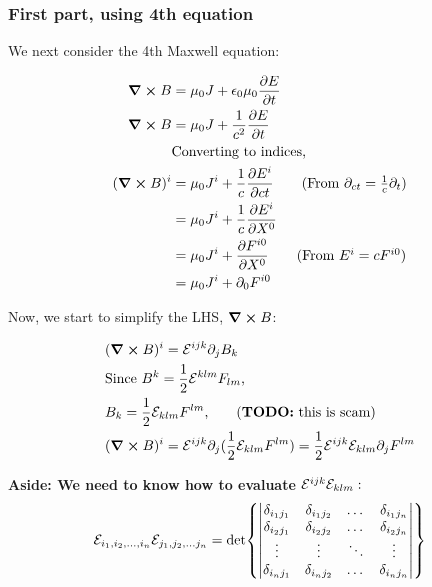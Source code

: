 \subsubsection{First part, using 4th equation}

We next consider the 4th Maxwell equation:

\begin{align*}
    \curl B &= \mu_0 J + \epsilon_0 \mu_0 \pdv{E}{t} \\
    \curl B &= \mu_0 J + \frac{1}{c^2} \pdv{E}{t} \\
            &\text{Converting to indices,}\\
    (\curl B)^i &= \mu_0 J^i + \frac{1}{c} \pdv{E^i}{ct} \tag{From $\partial_{ct} = \frac{1}{c} \partial_t$} \\
                &= \mu_0 J^i + \frac{1}{c} \pdv{E^i}{X^0} \\
                &= \mu_0 J^i + \pdv{F^{i0}}{X^0} \tag{From $E^i = c F^{i0}$} \\
                &= \mu_0 J^i + \partial_0 F^{i0}
\end{align*}

Now, we start to simplify the LHS, $\curl B$:

\begin{align*}
    &(\curl B)^i = \levicevita^{ijk} \partial_j B_k \\
    &\text{Since $B^k = \frac{1}{2} \levicevita^{klm} F_{lm}$,} \\
    &\text{$B_k = \frac{1}{2} \levicevita_{klm} F^{lm}$,} \tag{\textbf{TODO:} this is scam} \\
    &(\curl B)^i = \levicevita^{ijk} \partial_j (\frac{1}{2} \levicevita_{klm} F^{lm}) =
    \frac{1}{2} \levicevita^{ijk} \levicevita_{klm} \partial_j F^{lm}\\
\end{align*}

\textbf{Aside: We need to know how to evaluate $\mathcal{E}^{ijk} \mathcal{E}_{klm}:$}
\begin{align*}
    \mathcal{E}_{i_1, i_2, \dots, i_n} \mathcal{E}_{j_1, j_2, \dots j_n} =  
    \det{
    \begin{vmatrix}
        \delta_{i_1 j_1} & \delta_{i_1 j_2} &\dots &\delta_{i_1 j_n} \\
        \delta_{i_2 j_1} &\delta_{i_2 j_2} &\dots &\delta_{i_2 j_n} \\
        \vdots           &\vdots  & \ddots & \vdots \\
        \delta_{i_n j_1} & \delta_{i_n j_2} & \dots & \delta_{i_n j_n}
\end{vmatrix}}
\end{align*}

